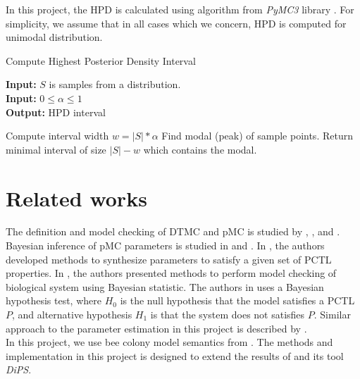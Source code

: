 \documentclass[12pt]{article}
\theoremstyle{definition}
\begin{document}
In this project, the HPD is calculated using algorithm from \textit{PyMC3}
library \cite{salvatier2016pymc3}. For simplicity, we assume that in all cases which we concern,
HPD is computed for unimodal distribution.
\begin{algorithm}[H]
  \caption{Compute Highest Posterior Density Interval}\label{mhalg}
  \hspace*{\algorithmicindent} \textbf{Input:} $S$ is samples from a distribution. \\
  \hspace*{\algorithmicindent} \textbf{Input:} $0\leq \alpha \leq 1$ \\
  \hspace*{\algorithmicindent} \textbf{Output:} HPD interval 
  \begin{algorithmic}[1]
    \State Compute interval width $w = |S| * \alpha$
    \State Find modal (peak) of sample points.
    \State Return minimal interval of size $|S| - w$ which contains the modal. 
    \EndProcedure
  \end{algorithmic}
\end{algorithm}


\section{Related works}
The definition and model checking of DTMC and pMC is studied by
\cite{baier2008principles}, \cite{hutschenreiter2017parametric}, and \cite{katoen2016probabilistic}.\\
Bayesian inference of pMC parameters is studied in \cite{polgreen2016data} and
\cite{jha2009bayesian}. In \cite{polgreen2016data}, the authors developed
methods to synthesize parameters to satisfy a given set of PCTL properties. In
\cite{jha2009bayesian}, the authors presented methods to perform model checking
of biological system using Bayesian statistic. The authors in
\cite{jha2009bayesian} uses a Bayesian hypothesis test, where $H_0$ is the null
hypothesis that the model satisfies a PCTL $P$, and alternative hypothesis $H_1$
is that the system does not satisfies $P$. Similar approach to the parameter
estimation in this project is described by \cite{hussain2015automated}.\\
In this project, we use bee colony model semantics from \cite{hajnal2019data}.
The methods and implementation in this project is designed to extend the results
of \cite{hajnal2019data} and its tool \textit{DiPS}.
\end{document}
